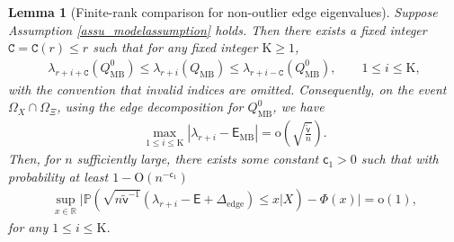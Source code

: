 \documentclass[12pt]{article}
\theoremstyle{plain}
\newtheorem{lemma}{Lemma}[section]
\numberwithin{equation}{section}
\begin{document}
\begin{lemma}[Finite-rank comparison for non-outlier edge eigenvalues]
	\label{lem_finite_rank_edge_comparison}
	Suppose Assumption \ref{assu_modelassumption} holds. Then there exists a fixed integer $\mathtt{C}=\mathtt{C}(r)\le r$ such that
	for any fixed integer $\mathrm{K}\ge1$,
	\begin{align*}
		\lambda_{r+i+\mathtt{C}}(Q_{\mathrm{MB}}^0)\le\lambda_{r+i}(Q_{\mathrm{MB}})\le\lambda_{r+i-\mathtt{C}}(Q_{\mathrm{MB}}^0),\qquad 1\le i\le \mathrm{K},
	\end{align*}
	with the convention that invalid indices are omitted. Consequently, on the event $\Omega_X\cap\Omega_{\Xi}$, using the edge decomposition for $Q_{\mathrm{MB}}^0$, we have
	\begin{align*}
		\max_{1\le i\le \mathrm{K}}\left|\lambda_{r+i}-\mathsf{E}_{\mathrm{MB}}\right|=
		\mathrm{o}(\sqrt{\frac{\tilde{\mathsf{v}}}{n}}).
	\end{align*}
	Then, for $n$ sufficiently large, there exists some constant $\mathsf{c}_1>0$ such that with probability at least $1-\mathrm{O}(n^{-\mathsf{c}_1})$
	\begin{align}\label{eq_conditionalclt_nonspike_QMB}
		\sup_{x\in\mathbb R}\big|\mathbb{P}(\sqrt{n\tilde{\mathsf{v}}^{-1}}(\lambda_{r+i}-\mathsf{E}+\Delta_{\mathrm{edge}})\leq x|X)-\Phi(x)\big|=\mathrm{o}(1),
	\end{align}
	for any $1\leq i\leq \mathrm{K}$.
\end{lemma}
\end{document}

